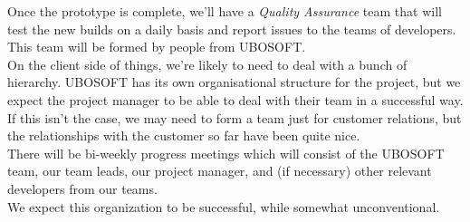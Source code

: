 \documentclass{article}
\begin{document}
  Once the prototype is complete, we'll have a {\it Quality Assurance} team that
  will test the new builds on a daily basis and report issues to the teams of
  developers. This team will be formed by people from UBOSOFT. \\

  On the client side of things, we're likely to need to deal with a bunch of
  hierarchy. UBOSOFT has its own organisational structure for the project, but
  we expect the project manager to be able to deal with their team in a
  successful way. If this isn't the case, we may need to form a team just for
  customer relations, but the relationships with the customer so far have been
  quite nice. \\

  There will be bi-weekly progress meetings which will consist of the UBOSOFT
  team, our team leads, our project manager, and (if necessary) other relevant
  developers from our teams. \\

  We expect this organization to be successful, while somewhat unconventional.
\end{document}
